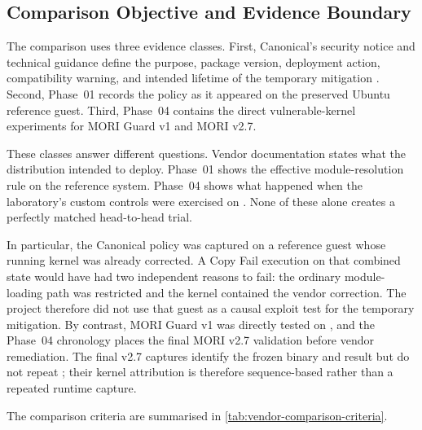 \subsection{Comparison Objective and Evidence Boundary}

The comparison uses three evidence classes. First, Canonical's security notice
and technical guidance define the purpose, package version, deployment action,
compatibility warning, and intended lifetime of the temporary mitigation
\cite{ubuntu-copyfail-cve,ubuntu-copyfail-fixes}. Second, Phase~01 records the
policy as it appeared on the preserved Ubuntu reference guest. Third, Phase~04
contains the direct vulnerable-kernel experiments for MORI Guard v1 and MORI
v2.7.

These classes answer different questions. Vendor documentation states what the
distribution intended to deploy. Phase~01 shows the effective module-resolution
rule on the reference system. Phase~04 shows what happened when the laboratory's
custom controls were exercised on . None of these alone
creates a perfectly matched head-to-head trial.

In particular, the Canonical  policy was captured on a reference
guest whose running  kernel was already corrected. A
Copy Fail execution on that combined state would have had two independent
reasons to fail: the ordinary module-loading path was restricted and the kernel
contained the vendor correction. The project therefore did not use that guest
as a causal exploit test for the temporary mitigation. By contrast, MORI Guard
v1 was directly tested on , and the Phase~04 chronology
places the final MORI v2.7 validation before vendor remediation. The final v2.7
captures identify the frozen binary and result but do not repeat ;
their kernel attribution is therefore sequence-based rather than a repeated
runtime capture.

The comparison criteria are summarised in \cref{tab:vendor-comparison-criteria}.

